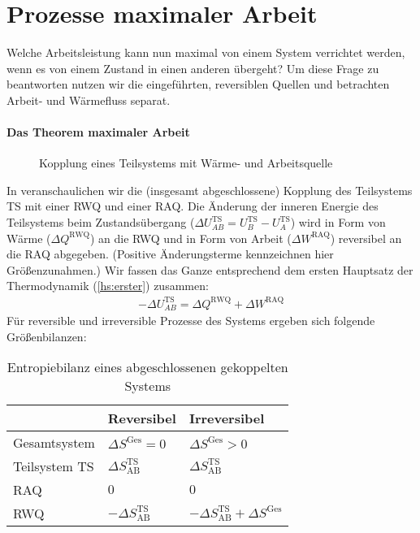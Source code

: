 \section{Prozesse maximaler Arbeit}
Welche Arbeitsleistung kann nun maximal von einem System verrichtet werden, wenn es von einem Zustand in einen anderen übergeht? 
Um diese Frage zu beantworten nutzen wir die eingeführten, reversiblen Quellen und betrachten Arbeit- und Wärmefluss separat. 

\paragraph*{Das Theorem maximaler Arbeit}
\begin{figure}[htbp]
    \centering
    \tfigTheoremMaximizedWork
    \caption{Kopplung eines Teilsystems mit Wärme- und Arbeitsquelle}
    \label{fig:MaximaleArbeit}
\end{figure}
In  veranschaulichen wir die (insgesamt abgeschlossene) Kopplung des Teilsystems TS mit einer RWQ und einer RAQ. Die Änderung der inneren Energie des Teilsystems beim Zustandsübergang ($\Delta U^{\mathrm{TS}}_{AB}=U^{\mathrm{TS}}_{B}-U^{\mathrm{TS}}_{A}$) wird in Form von Wärme ($\Delta Q^{\mathrm{RWQ}}$) an die RWQ und in Form von Arbeit ($\Delta W^{\mathrm{RAQ}}$) reversibel an die RAQ abgegeben. (Positive Änderungsterme kennzeichnen hier Größenzunahmen.) Wir fassen das Ganze entsprechend dem ersten Hauptsatz der Thermodynamik (\ref{hs:erster}) zusammen:
\begin{align}
    \label{eq:maximaleArbeit}
    -\Delta U^{\mathrm{TS}}_{AB}=\Delta Q^{\mathrm{RWQ}}+\Delta W^{\mathrm{RAQ}}
\end{align}
Für reversible und irreversible Prozesse des Systems ergeben sich folgende Größenbilanzen:
\renewcommand*{\arraystretch}{1.3}
\begin{table}[b]
    \centering
    \caption{Entropiebilanz eines abgeschlossenen gekoppelten Systems}
    \begin{tabularx}{.5\textwidth}{|l|X|l|}
        \hline
        \rowcolor{formalshade!98!blue}
        &Reversibel &Irreversibel\\
        \hline
        \rowcolor{formalshade}
        Gesamtsystem&$\Delta S^\mathrm{Ges}=0$&$\Delta S^\mathrm{Ges}>0$\\
        \rowcolor{formalshade!80!white}
        Teilsystem TS&$\Delta S^{\mathrm{TS}}_{\mathrm{AB}}$&$\Delta S^{\mathrm{TS}}_{\mathrm{AB}}$\\
        \rowcolor{formalshade}
        RAQ&$0$&$0$\\
        \rowcolor{formalshade!80!white}
        RWQ&$-\Delta S^{\mathrm{TS}}_\mathrm{AB}$&$-\Delta S^{\mathrm{TS}}_\mathrm{AB}+\Delta S^\mathrm{Ges}$\\
        \hline
    \end{tabularx} 
    \label{tab:Entropiebilanz}
\end{table}
